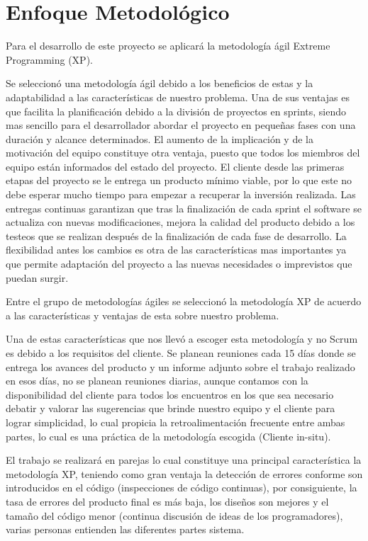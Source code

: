 \chapter{Enfoque Metodológico}

Para el desarrollo de este proyecto se aplicará la metodología ágil Extreme Programming (XP). 

Se seleccionó una metodología ágil debido a los beneficios de estas y la adaptabilidad a las características de nuestro problema. Una de sus ventajas es que facilita la planificación debido a la división de proyectos en sprints, siendo mas sencillo para el desarrollador abordar el proyecto en pequeñas fases con una duración y alcance determinados. El aumento de la implicación y de la motivación del equipo constituye otra ventaja, puesto que todos los miembros del equipo están informados del estado del proyecto. El cliente desde las primeras etapas del proyecto se le entrega un producto mínimo viable, por lo que este no debe esperar mucho tiempo para empezar a recuperar la inversión realizada. Las entregas continuas garantizan que tras la finalización de cada sprint el software se actualiza con nuevas modificaciones, mejora la calidad del producto debido a los testeos que se realizan después de la finalización de cada fase de desarrollo. La flexibilidad antes los cambios es otra de las características mas importantes ya que permite adaptación del proyecto a las nuevas necesidades o imprevistos que puedan surgir. 

Entre el grupo de metodologías ágiles se seleccionó la metodología XP de acuerdo a las características y ventajas de esta sobre nuestro problema.

Una de estas características que nos llevó a escoger esta metodología y no Scrum es debido a los requisitos del cliente. Se planean reuniones cada 15 días donde se entrega los avances del producto y un informe adjunto sobre el trabajo realizado en esos días, no se planean reuniones diarias, aunque  contamos con la disponibilidad del cliente para todos los encuentros en los que sea necesario debatir y valorar las sugerencias que brinde nuestro equipo y el cliente para lograr simplicidad, lo cual propicia la retroalimentación frecuente entre ambas partes, lo cual es una práctica de la metodología escogida (Cliente in-situ).

El trabajo se realizará en parejas lo cual constituye una principal característica la metodología XP, teniendo como gran ventaja la detección de errores conforme son introducidos en el código (inspecciones de código continuas), por consiguiente, la tasa de errores del producto final es más baja, los diseños son mejores y el tamaño del código menor (continua discusión de ideas de los programadores), varias personas entienden las diferentes partes sistema.

